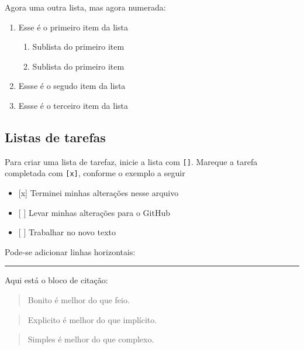 \documentclass[11pt]{article}
\providecommand{\tightlist}{%
      \setlength{\itemsep}{0pt}\setlength{\parskip}{0pt}}
\begin{document}
Agora uma outra lista, mas agora numerada:

\begin{enumerate}
\def\labelenumi{\arabic{enumi}.}
\tightlist
\item
  Esse é o primeiro item da lista

  \begin{enumerate}
  \def\labelenumii{\arabic{enumii}.}
  \tightlist
  \item
    Sublista do primeiro item
  \item
    Sublista do primeiro item
  \end{enumerate}
\item
  Essse é o segudo item da lista
\item
  Essse é o terceiro item da lista
\end{enumerate}

\subsection{Listas de tarefas}\label{listas-de-tarefas}

Para criar uma lista de tarefaz, inicie a lista com \texttt{{[}{]}}.
Mareque a tarefa completada com \texttt{{[}x{]}}, conforme o exemplo a
seguir

\begin{itemize}
\tightlist
\item
  {[}x{]} Terminei minhas alterações nesse arquivo
\item
  {[} {]} Levar minhas alterações para o GitHub
\item
  {[} {]} Trabalhar no novo texto
\end{itemize}

    Pode-se adicionar linhas horizontais:

\begin{center}\rule{0.5\linewidth}{\linethickness}\end{center}

    Aqui está o bloco de citação:

\begin{quote}
Bonito é melhor do que feio.
\end{quote}

\begin{quote}
Explicito é melhor do que implícito.
\end{quote}

\begin{quote}
Simples é melhor do que complexo.
\end{quote}
\end{document}
